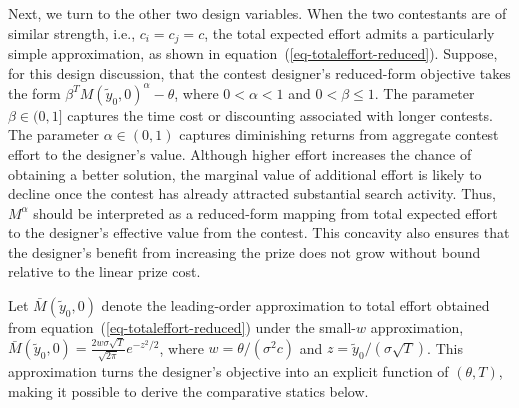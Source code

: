 \documentclass[mnsc]{informs3}
\begin{document}
Next, we turn to the other two design variables.
When the two contestants are of similar strength, i.e., $c_i = c_j = c$, the total expected effort admits a particularly simple approximation, as shown in equation~(\ref{eq-totaleffort-reduced}).
Suppose, for this design discussion, that the contest designer's reduced-form objective takes the form $\beta^{T}M(\tilde{y}_0,0)^\alpha-\theta$, where $0<\alpha<1$ and $0<\beta\leq 1$.
The parameter $\beta\in(0,1]$ captures the time cost or discounting associated
with longer contests.
The parameter $\alpha\in(0,1)$ captures diminishing returns from aggregate
contest effort to the designer's value.
Although higher effort increases the chance of obtaining a better solution, the marginal value of additional effort is likely to decline once the contest has already attracted substantial search
activity.
Thus, $M^\alpha$ should be interpreted as a reduced-form mapping from total expected effort to the designer's effective value from the contest.
This concavity also ensures that the designer's benefit from increasing the prize does not grow without bound relative to the linear prize cost.


Let $\bar{M}(\tilde y_0,0)$ denote the leading-order approximation to total effort obtained from equation~(\ref{eq-totaleffort-reduced}) under the small-$w$ approximation, $\bar{M}(\tilde y_0,0) = \frac{2w\sigma\sqrt{T}}{\sqrt{2\pi}}e^{-z^2/2}$, where $w=\theta/(\sigma^2c)$ and $z=\tilde y_0/(\sigma\sqrt{T})$.
This approximation turns the designer's objective into an explicit function of $(\theta,T)$, making it possible to derive the comparative statics below.
\end{document}
